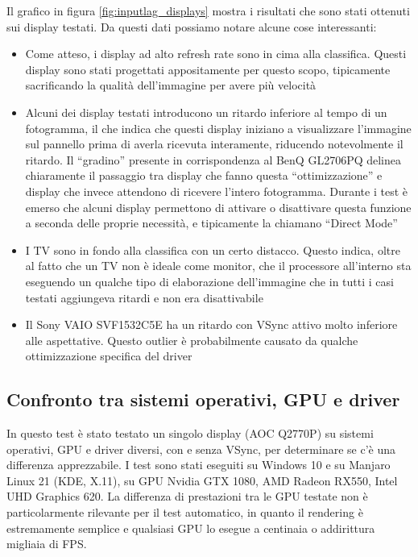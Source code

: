 Il grafico in figura \ref{fig:inputlag_displays} mostra i risultati che sono stati ottenuti sui display testati. Da questi dati possiamo notare alcune cose interessanti:\begin{itemize}
	\item Come atteso, i display ad alto refresh rate sono in cima alla classifica. Questi display sono stati progettati appositamente per questo scopo, tipicamente sacrificando la qualità dell'immagine per avere più velocità
	\item Alcuni dei display testati introducono un ritardo inferiore al tempo di un fotogramma, il che indica che questi display iniziano a visualizzare l'immagine sul pannello prima di averla ricevuta interamente, riducendo notevolmente il ritardo. Il ``gradino'' presente in corrispondenza al BenQ GL2706PQ delinea chiaramente il passaggio tra display che fanno questa ``ottimizzazione'' e display che invece attendono di ricevere l'intero fotogramma. Durante i test è emerso che alcuni display permettono di attivare o disattivare questa funzione a seconda delle proprie necessità, e tipicamente la chiamano ``Direct Mode''
	\item I TV sono in fondo alla classifica con un certo distacco. Questo indica, oltre al fatto che un TV non è ideale come monitor, che il processore all'interno sta eseguendo un qualche tipo di elaborazione dell'immagine che in tutti i casi testati aggiungeva ritardi e non era disattivabile
	\item Il Sony VAIO SVF1532C5E ha un ritardo con VSync attivo molto inferiore alle aspettative. Questo outlier è probabilmente causato da qualche ottimizzazione specifica del driver
\end{itemize}

\subsection{Confronto tra sistemi operativi, GPU e driver}
In questo test è stato testato un singolo display (AOC Q2770P) su sistemi operativi, GPU e driver diversi, con e senza VSync, per determinare se c'è una differenza apprezzabile. I test sono stati eseguiti su Windows 10 e su Manjaro Linux 21 (KDE, X.11), su GPU Nvidia GTX 1080, AMD Radeon RX550, Intel UHD Graphics 620. La differenza di prestazioni tra le GPU testate non è particolarmente rilevante per il test automatico, in quanto il rendering è estremamente semplice e qualsiasi GPU lo esegue a centinaia o addirittura migliaia di FPS.

